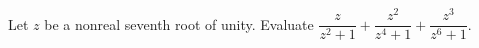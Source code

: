 Let $z$ be a nonreal seventh root of unity. Evaluate $\dfrac{z}{z^2+1}+\dfrac{z^2}{z^4+1}+\dfrac{z^3}{z^6+1}$.
